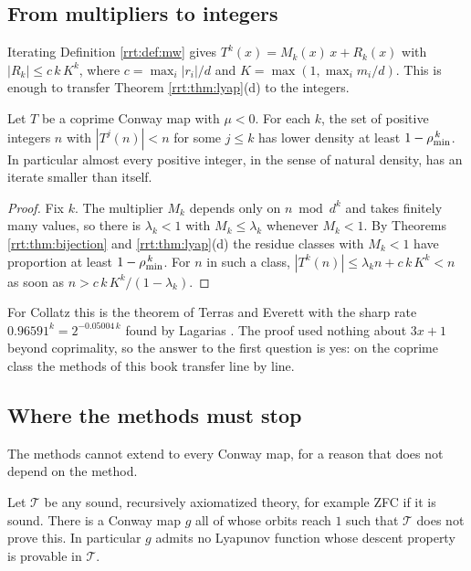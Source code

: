 \subsection{From multipliers to integers}
Iterating Definition \ref{rrt:def:mw} gives $T^k(x)=M_k(x)\,x+R_k(x)$ with $|R_k|\le c\,k\,K^k$, where $c=\max_i|r_i|/d$ and $K=\max(1,\max_i m_i/d)$. This is enough to transfer Theorem \ref{rrt:thm:lyap}(d) to the integers.

\begin{theorem}\label{rrt:thm:density}
Let $T$ be a coprime Conway map with $\mu<0$. For each $k$, the set of positive integers $n$ with $|T^j(n)|<n$ for some $j\le k$ has lower density at least $1-\rho_{\min}^{\,k}$. In particular almost every positive integer, in the sense of natural density, has an iterate smaller than itself.
\end{theorem}

\begin{proof}
Fix $k$. The multiplier $M_k$ depends only on $n \bmod d^k$ and takes finitely many values, so there is $\lambda_k<1$ with $M_k\le\lambda_k$ whenever $M_k<1$. By Theorems \ref{rrt:thm:bijection} and \ref{rrt:thm:lyap}(d) the residue classes with $M_k<1$ have proportion at least $1-\rho_{\min}^{\,k}$. For $n$ in such a class, $|T^k(n)|\le \lambda_k n+c\,k\,K^k<n$ as soon as $n>c\,k\,K^k/(1-\lambda_k)$.
\end{proof}

For Collatz this is the theorem of Terras and Everett with the sharp rate $0.96591^k=2^{-0.05004\,k}$ found by Lagarias \cite{lagarias1985}. The proof used nothing about $3x+1$ beyond coprimality, so the answer to the first question is yes: on the coprime class the methods of this book transfer line by line.

\subsection{Where the methods must stop}
The methods cannot extend to every Conway map, for a reason that does not depend on the method.

\begin{proposition}\label{rrt:prop:unprovable}
Let $\mathcal{T}$ be any sound, recursively axiomatized theory, for example ZFC if it is sound. There is a Conway map $g$ all of whose orbits reach $1$ such that $\mathcal{T}$ does not prove this. In particular $g$ admits no Lyapunov function whose descent property is provable in $\mathcal{T}$.
\end{proposition}

